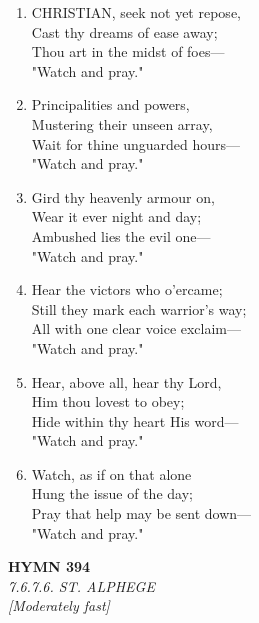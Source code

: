 \documentclass[11pt,a4paper]{article}
\begin{document}
\begin{enumerate}
    \item CHRISTIAN, seek not yet repose, \\
        Cast thy dreams of ease away; \\
        Thou art in the midst of foes--- \\
        "Watch and pray."

    \item Principalities and powers, \\
        Mustering their unseen array, \\
        Wait for thine unguarded hours--- \\
        "Watch and pray."

    \item Gird thy heavenly armour on, \\
        Wear it ever night and day; \\
        Ambushed lies the evil one--- \\
        "Watch and pray."

    \item Hear the victors who o'ercame; \\
        Still they mark each warrior's way; \\
        All with one clear voice exclaim--- \\
        "Watch and pray."

    \item Hear, above all, hear thy Lord, \\
        Him thou lovest to obey; \\
        Hide within thy heart His word--- \\
        "Watch and pray."

    \item Watch, as if on that alone \\
        Hung the issue of the day; \\
        Pray that help may be sent down--- \\
        "Watch and pray."

\end{enumerate}

\newpage
\begin{center}
    {\Large \textbf{HYMN 394}}
    \\
    \textit{7.6.7.6. ST. ALPHEGE}
    \\
    \textit{\small [Moderately fast]}
\end{center}
\vspace{1em}
\end{document}
